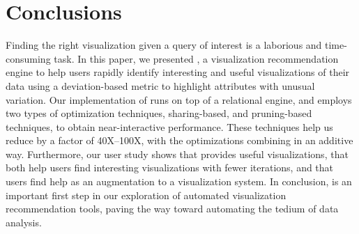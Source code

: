 
\section{Conclusions}
\label{sec:conc}

Finding the right visualization given a query of interest is a
laborious and time-consuming task.
In this paper, we presented \SeeDB, a visualization recommendation
engine to help users 
rapidly identify interesting and useful visualizations of their data using a deviation-based 
metric to highlight attributes with unusual variation.
Our implementation of \SeeDB runs on top of a relational engine, and employs two types of optimization 
techniques, sharing-based, and pruning-based techniques, to obtain near-interactive performance.
These techniques help us reduce by a factor of 40X--100X, with the optimizations combining in an additive way. 
Furthermore, our user study shows that \SeeDB provides useful
visualizations, that both help users find interesting visualizations with fewer iterations, and that
users find help as an augmentation to a visualization system.
In conclusion, \SeeDB is an important first step in our exploration of 
automated visualization recommendation tools, 
paving the way toward automating the tedium of data analysis.



